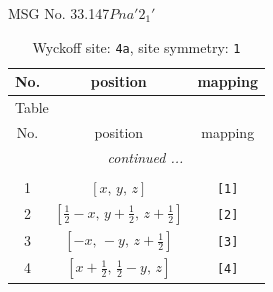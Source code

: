 \documentclass[fleqn,8pt]{jsarticle}
\begin{document}
\setcounter{MaxMatrixCols}{32}

\renewcommand{\tablename}{Table~}
\renewcommand{\figurename}{Figure~}
\begin{center}
\LARGE
MSG No. 33.147\quad$Pna'2_{1}'$
\end{center}
\renewcommand{\arraystretch}{1.2}
\begin{longtable}{ccc}
\caption{Wyckoff site: {\tt 4a}, site symmetry: {\tt 1}}
 \\
 \hline \hline
No. & position & mapping \\ \hline \endfirsthead

\multicolumn{2}{l}{\tablename\ \thetable{}} \\
 \hline \hline
No. & position & mapping \\ \hline \endhead

 \hline \hline
\multicolumn{2}{r}{\footnotesize\it continued ...} \\ \endfoot

 \hline \hline
\multicolumn{2}{r}{} \\ \endlastfoot

1 & $\left[ x,\, y,\, z \right]$ & {\tt [1]} \\ \hline
2 & $\left[ \frac{1}{2} - x,\, y + \frac{1}{2},\, z + \frac{1}{2} \right]$ & {\tt [2]} \\ \hline
3 & $\left[ - x,\, - y,\, z + \frac{1}{2} \right]$ & {\tt [3]} \\ \hline
4 & $\left[ x + \frac{1}{2},\, \frac{1}{2} - y,\, z \right]$ & {\tt [4]} \\
\end{longtable}
\end{document}
